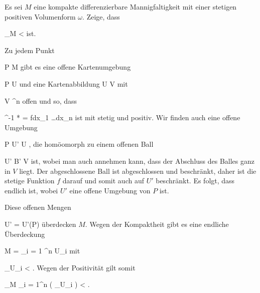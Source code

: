 {

Es sei $M$ eine kompakte differenzierbare Mannigfaltigkeit mit einer stetigen positiven Volumenform $\omega$. Zeige, dass

\mavergleichskettedisp
{\vergleichskette
{ \int_M \omega
}
{ <} { \infty
}
{ } {
}
{ } {
}
{ } {
}
}
{}{}{}
ist.

}
{

Zu jedem Punkt

\mavergleichskette
{\vergleichskette
{ P
}
{ \in }{ M
}
{  }{
}
{    }{
}
{   }{
}
}
{}{}{}
gibt es eine offene Kartenumgebung

\mavergleichskette
{\vergleichskette
{ P
}
{ \in }{ U
}
{  }{
}
{    }{
}
{   }{
}
}
{}{}{}
und eine Kartenabbildung
\maabbdisp {\alpha} { U } { V
} {}
mit

\mavergleichskette
{\vergleichskette
{ V
}
{ \subseteq }{ \R^n
}
{  }{
}
{    }{
}
{   }{
}
}
{}{}{}
offen und so, dass

\mavergleichskette
{\vergleichskette
{ \alpha^{-1 *} \omega
}
{ = }{ fdx_1 \wedge \ldots \wedge dx_n
}
{  }{
}
{    }{
}
{   }{
}
}
{}{}{}
ist mit
 stetig und positiv. Wir finden auch eine offene Umgebung

\mavergleichskette
{\vergleichskette
{ P
}
{ \in }{ U'
}
{ \subseteq }{ U
}
{    }{
}
{   }{
}
}
{}{}{,}
die homöomorph zu einem offenen Ball

\mavergleichskette
{\vergleichskette
{ U'
}
{ \cong }{ B'
}
{ \subseteq }{ V
}
{    }{
}
{   }{
}
}
{}{}{}
ist, wobei man auch annehmen kann, dass der Abschluss des Balles ganz in $V$ liegt. Der abgeschlossene Ball ist abgeschlossen und beschränkt, daher ist die stetige Funktion $f$ darauf und somit auch auf $U'$ beschränkt. Es folgt, dass
 endlich ist, wobei $U'$ eine offene Umgebung von $P$ ist.

Diese offenen Mengen

\mavergleichskette
{\vergleichskette
{ U'
}
{ = }{ U'(P)
}
{  }{
}
{    }{
}
{   }{
}
}
{}{}{}
überdecken $M$. Wegen der Kompaktheit gibt es eine endliche Überdeckung

\mavergleichskettedisp
{\vergleichskette
{ M
}
{ =} { \bigcup_{i = 1} ^n U_i
}
{ } {
}
{ } {
}
{ } {
}
}
{}{}{}
mit

\mavergleichskettedisp
{\vergleichskette
{ \int_{U_i } \omega
}
{ <} { \infty
}
{ } {
}
{ } {
}
{ } {
}
}
{}{}{.}
Wegen der Positivität gilt somit

\mavergleichskettedisp
{\vergleichskette
{ \int_{M} \omega
}
{ \leq} { \sum_{i = 1}^n  \left(  \int_{U_i } \omega  \right)
}
{ <} { \infty
}
{ } {
}
{ } {
}
}
{}{}{.}

 }

